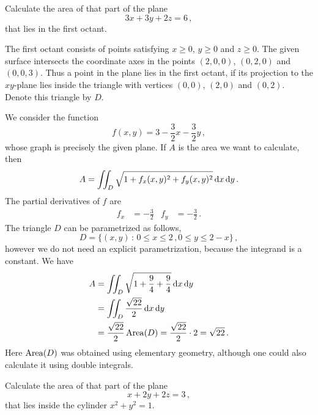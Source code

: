 \begin{question}
Calculate the area of that part of the plane
\[
3x + 3y + 2z = 6\,,
\]
that lies in the first octant.
\end{question}

\begin{solution}
The first octant consists of points satisfying $x \geq 0$, $y \geq 0$ and $z \geq 0$. The given surface intersects the coordinate axes in the points $(2,0,0)$, $(0,2,0)$ and $(0,0,3)$. Thus a point in the plane lies in the first octant, if its projection to the $xy$-plane lies inside the triangle with vertices $(0,0)$, $(2,0)$ and $(0,2)$. Denote this triangle by $D$.

\begin{wrapfigure}{r}{0.35\textwidth}
\begin{center}
\end{center}
\end{wrapfigure}

We consider the function
\[
f(x,y) = 3 - \frac 32 x - \frac 32 y\,,
\]
whose graph is precisely the given plane. If $A$ is the area we want to calculate, then
\[
A = \iint_D \sqrt{1 + f_x(x,y)^2 + f_y(x,y)^2} \,\mathrm{d} x \,\mathrm{d} y\,.
\]
The partial derivatives of $f$ are
\begin{align*}
f_x &= -\frac 32 & f_y &= -\frac 32\,.
\end{align*}
The triangle $D$ can be parametrized as follows,
\[
D = \{ (x,y) \,:\, 0 \leq x \leq 2\,, 0 \leq y \leq 2-x \}\,,
\]
however we do not need an explicit parametrization, because the integrand is a constant. We have
\begin{align*}
A &= \iint_D \sqrt{1 + \frac 94 + \frac 94} \,\mathrm{d} x \,\mathrm{d} y \\
&= \iint_D \frac{\sqrt{22}}2 \,\mathrm{d} x \,\mathrm{d} y \\
&= \frac{\sqrt{22}}{2} \operatorname{Area}(D) = \frac{\sqrt{22}}2 \cdot 2 = \sqrt{22}\,.
\end{align*}
Here $\operatorname{Area}(D)$ was obtained using elementary geometry, although one could also calculate it using double integrals.
\end{solution}

\begin{question}
Calculate the area of that part of the plane
\[
x + 2y + 2z = 3\,,
\]
that lies inside the cylinder $x^2 + y^2 = 1$.
\end{question}

